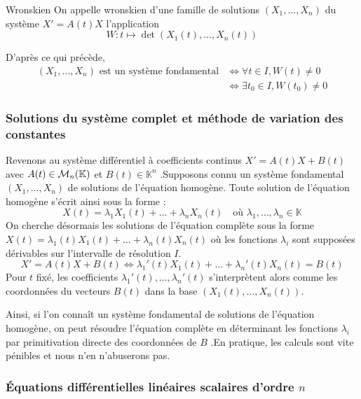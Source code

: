     \begin{defi}{Wronskien}{}
        On appelle wronskien d’une famille de solutions $(X_1,\ldots,X_n)$ du système $X' = A(t)X$ l’application 
        \[ W : t \longmapsto \det\left(X_1(t),\ldots,X_n(t)\right) \]
    \end{defi}

    D’après ce qui précède, 
    \begin{align*}
        (X_1,\ldots,X_n) \text{ est un système fondamental}
        & \iff \forall t \in I, W(t) \neq 0 \\
        & \iff \exists t_0 \in I, W(t_0) \neq 0
    \end{align*}

    \subsubsection{Solutions du système complet et méthode de variation des constantes}

    Revenons au système différentiel à coefficients continus $X' = A(t)X + B (t)$ avec $A(t) \in \mathcal{M}_{n}(\mathbb{K})$ et $B(t) \in \mathbb{K}^n$ .Supposons connu un système fondamental $(X_1,\ldots, X_n)$ de solutions de l’équation homogène. Toute solution de l’équation homogène s’écrit ainsi sous la forme :
    \[ X(t) = \lambda_1 X_1(t) + \ldots + \lambda_n X_n(t) \quad \text{où } \lambda_1, \ldots, \lambda_n \in \mathbb{K} \]
    On cherche désormais les solutions de l’équation complète sous la forme $X(t) = \lambda_1(t) X_1(t) + \ldots + \lambda_n(t) X_n(t)$ où les fonctions $\lambda_i$ sont supposées dérivables sur l’intervalle de résolution $I$.
    \[ X' = A(t)X + B(t) \iff \lambda_1'(t) X_1(t) + \ldots + \lambda_n'(t) X_n(t) = B(t) \]
    Pour $t$ fixé, les coefficients $\lambda_1'(t),\ldots,\lambda_n'(t)$ s’interprètent alors comme les coordonnées du vecteurs $B(t)$ dans la base $(X_1(t), \ldots , X_n(t))$.

    Ainsi, si l’on connaît un système fondamental de solutions de l’équation homogène, on peut résoudre l’équation complète en déterminant les fonctions $\lambda_i$ par primitivation directe des coordonnées de $B$ .En pratique, les calculs sont vite pénibles et nous n’en n’abuserons pas.

    \subsubsection{Équations différentielles linéaires scalaires d’ordre $n$}

